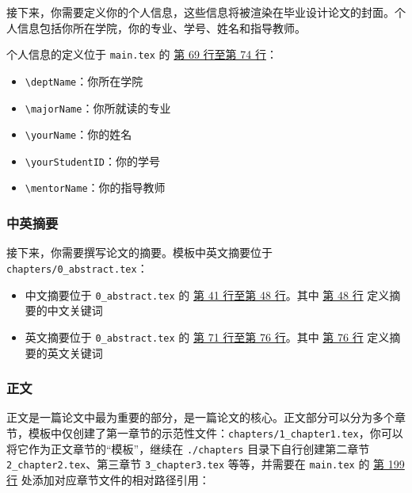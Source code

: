 接下来，你需要定义你的个人信息，这些信息将被渲染在毕业设计论文的封面。个人信息包括你所在学院，你的专业、学号、姓名和指导教师。

个人信息的定义位于 \texttt{main.tex} 的 \href{https://github.com/spencerwooo/BIThesis/blob/master/graduation-thesis/main.tex#L69-L74}{第 69 行至第 74 行}：

\begin{itemize}
  \item \texttt{\textbackslash deptName}：你所在学院
  \item \texttt{\textbackslash majorName}：你所就读的专业
  \item \texttt{\textbackslash yourName}：你的姓名
  \item \texttt{\textbackslash yourStudentID}：你的学号
  \item \texttt{\textbackslash mentorName}：你的指导教师
\end{itemize}

\subsubsection{中英摘要}

接下来，你需要撰写论文的摘要。模板中英文摘要位于\\ \texttt{chapters/0\_abstract.tex}：

\begin{itemize}
  \item 中文摘要位于 \texttt{0\_abstract.tex} 的 \href{https://github.com/spencerwooo/BIThesis/blob/master/graduation-thesis/chapters/0_abstract.tex#L41-L48}{第 41 行至第 48 行}。其中 \href{https://github.com/spencerwooo/BIThesis/blob/master/graduation-thesis/chapters/0_abstract.tex#L48}{第 48 行} 定义摘要的中文关键词
  \item 英文摘要位于 \texttt{0\_abstract.tex} 的 \href{https://github.com/spencerwooo/BIThesis/blob/master/graduation-thesis/chapters/0_abstract.tex#L71-L76}{第 71 行至第 76 行}。其中 \href{https://github.com/spencerwooo/BIThesis/blob/master/graduation-thesis/chapters/0_abstract.tex#L76}{第 76 行} 定义摘要的英文关键词
\end{itemize}

\subsubsection{正文}

正文是一篇论文中最为重要的部分，是一篇论文的核心。正文部分可以分为多个章节，模板中仅创建了第一章节的示范性文件：\texttt{chapters/1\_chapter1.tex}，你可以将它作为正文章节的“模板”，继续在 \texttt{./chapters} 目录下自行创建第二章节 \texttt{2\_chapter2.tex}、第三章节 \texttt{3\_chapter3.tex} 等等，并需要在 \texttt{main.tex} 的 \href{https://github.com/spencerwooo/BIThesis/blob/master/graduation-thesis/main.tex#L199-L203}{第 199 行} 处添加对应章节文件的相对路径引用：

